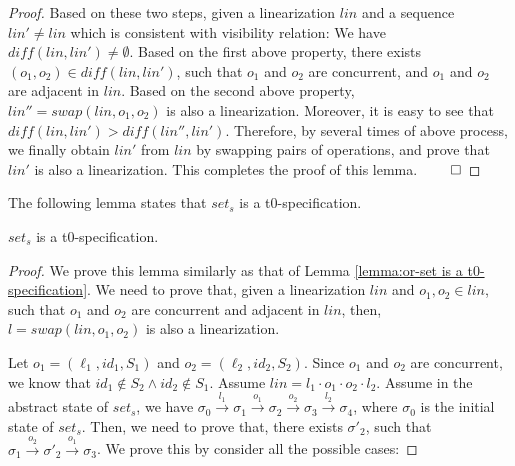 {\begin {proof}
Based on these two steps, given a linearization $\mathit{lin}$ and a sequence $\mathit{lin}' \neq \mathit{lin}$ which is consistent with visibility relation: We have $\mathit{diff}(\mathit{lin},\mathit{lin}') \neq \emptyset$. Based on the first above property, there exists $(o_1,o_2) \in \mathit{diff}(\mathit{lin},\mathit{lin}')$, such that $o_1$ and $o_2$ are concurrent, and $o_1$ and $o_2$ are adjacent in $\mathit{lin}$. Based on the second above property, $\mathit{lin}'' = \mathit{swap}(\mathit{lin},o_1,o_2)$ is also a linearization. Moreover, it is easy to see that $\mathit{diff}(\mathit{lin},\mathit{lin}') > \mathit{diff}(\mathit{lin}'',\mathit{lin}')$. Therefore, by several times of above process, we finally obtain $\mathit{lin}'$ from $\mathit{lin}$ by swapping pairs of operations, and prove that $\mathit{lin}'$ is also a linearization. This completes the proof of this lemma. $\qed$
\end {proof}



The following lemma states that $\mathit{set}_s$ is a t0-specification.

\begin{lemma}
\label{lemma:set is a t0-specification}
$\mathit{set}_s$ is a t0-specification.
\end{lemma}

\begin {proof}

We prove this lemma similarly as that of Lemma \ref{lemma:or-set is a t0-specification}. We need to prove that, given a linearization $\mathit{lin}$ and $o_1,o_2 \in \mathit{lin}$, such that $o_1$ and $o_2$ are concurrent and adjacent in $\mathit{lin}$, then, $l = \mathit{swap}(\mathit{lin},o_1,o_2)$ is also a linearization.

Let $o_1 = (\ell_1,\mathit{id}_1,S_1)$ and $o_2 = (\ell_2,\mathit{id}_2,S_2)$. Since $o_1$ and $o_2$ are concurrent, we know that $\mathit{id}_1 \notin S_2 \wedge \mathit{id}_2 \notin S_1$. Assume $\mathit{lin} = l_1 \cdot o_1 \cdot o_2 \cdot l_2$. Assume in the abstract state of $\mathit{set}_s$, we have $\sigma_0 {\xrightarrow{l_1}} \sigma_1 {\xrightarrow{o_1}} \sigma_2 {\xrightarrow{o_2}} \sigma_3 {\xrightarrow{l_2}} \sigma_4$, where $\sigma_0$ is the initial state of $\mathit{set}_s$. Then, we need to prove that, there exists $\sigma'_2$, such that $\sigma_1 {\xrightarrow{o_2}} \sigma'_2 {\xrightarrow{o_1}} \sigma_3$. We prove this by consider all the possible cases:


\end{proof}}
